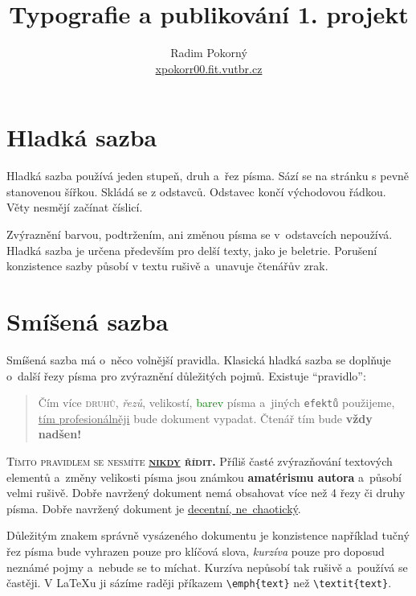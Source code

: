 \documentclass[10pt,twocolumn]{article}
\title{Typografie a publikování \textendash{} 1. projekt}
\author{Radim Pokorný\\\href{mailto:xpokorr00.fit.vutbr.cz}{xpokorr00.fit.vutbr.cz}}
\date{}
\newcommand*\chancery{\fontfamily{pzc}\selectfont}
\begin{document}
    \maketitle
    \section{Hladká sazba}\label{sec:1}
        Hladká sazba používá jeden stupeň, druh a~řez písma.
        Sází se na stránku s pevně stanovenou šířkou.
        Skládá se z odstavců. Odstavec končí východovou řádkou.
        Věty nesmějí začínat číslicí.
        
        Zvýraznění barvou, podtržením, ani změnou písma se v~odstavcích nepoužívá.
        Hladká sazba je určena především pro delší texty, jako je beletrie.
        Porušení konzistence sazby působí v textu rušivě a~unavuje čtenářův zrak.
    \section{Smíšená sazba}\label{sec:2}
        Smíšená sazba má o~něco volnější pravidla.
        Klasická hladká sazba se doplňuje o~další řezy písma pro zvýraznění důležitých pojmů.
        Existuje \enquote{pravidlo}:
        
        \begin{quotation}
            
            Čím více \textsc{druhů}, \emph{řezů}, {\scriptsize velikostí}, \textcolor{green}{barev} písma a~jiných \texttt{efektů} použijeme, \underline{tím profesionálněji} bude  {\chancery dokument} vypadat.
            Čtenář tím bude \begingroup \LARGE{\textbf{vždy nadšen!}}\endgroup
        \end{quotation}
        
        \textsc{Tímto pravidlem se nesmíte \textbf{\underline{nikdy} řídit.}}
        Příliš časté zvýrazňování textových elementů a~změny {\tiny velikosti} písma jsou známkou \textbf{amatérismu autora} a~působí velmi rušivě.
        Dobře navržený dokument nemá obsahovat více než 4 řezy či druhy písma.
        Dobře navržený dokument je \underline{decentní, ne~chaotický}.
        
        Důležitým znakem správně vysázeného dokumentu je konzistence\textendash{}
        například tučný řez písma bude vyhrazen pouze pro klíčová slova, \emph{kurzíva} pouze pro doposud neznámé pojmy a~nebude se to míchat.
        Kurzíva nepůsobí tak rušivě a~používá se častěji.
        V \LaTeX{}u ji sázíme raději příkazem \verb+\emph{text}+ než \verb+\textit{text}+.
        
\end{document}
